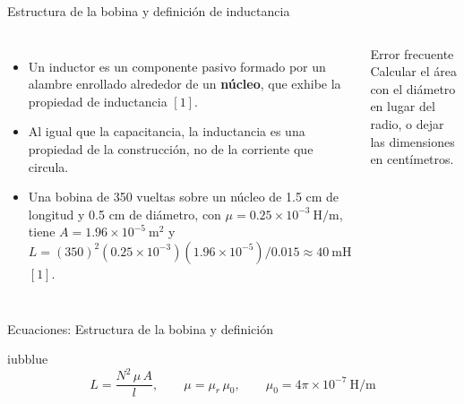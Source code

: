 \documentclass[aspectratio=169,11pt,xcolor={table}]{beamer}
\begin{document}
\begin{frame}{{\normalsize Estructura de la bobina y definición de inductancia}}
\begin{columns}[c,onlytextwidth]
\small
\begin{itemize}\setlength{\itemsep}{4pt}
  \item Un inductor es un componente pasivo formado por un alambre enrollado alrededor de un \textbf{núcleo}, que exhibe la propiedad de inductancia $[1]$.
  \item Al igual que la capacitancia, la inductancia es una propiedad de la construcción, no de la corriente que circula.
  \item Una bobina de 350 vueltas sobre un núcleo de 1.5 cm de longitud y 0.5 cm de diámetro, con $\mu = 0.25 \times 10^{-3}\ \text{H/m}$, tiene $A = 1.96 \times 10^{-5}\ \text{m}^2$ y $L = (350)^2 (0.25 \times 10^{-3})(1.96 \times 10^{-5}) / 0.015 \approx 40\ \text{mH}$ $[1]$.
\end{itemize}
\begin{cardO}{Error frecuente}
\footnotesize Calcular el área con el diámetro en lugar del radio, o dejar las dimensiones en centímetros.
\end{cardO}
\end{columns}
\end{frame}

\begin{frame}{Ecuaciones: Estructura de la bobina y definición}
\begin{cajaplana}{iubblue}
\centering
{\large
\begin{equation*}
  L = \frac{N^{2}\,\mu\,A}{l}, \qquad \mu = \mu_r\,\mu_0, \qquad \mu_0 = 4\pi \times 10^{-7}\ \text{H/m}
\end{equation*}
}
\end{cajaplana}
\end{frame}
\end{document}
